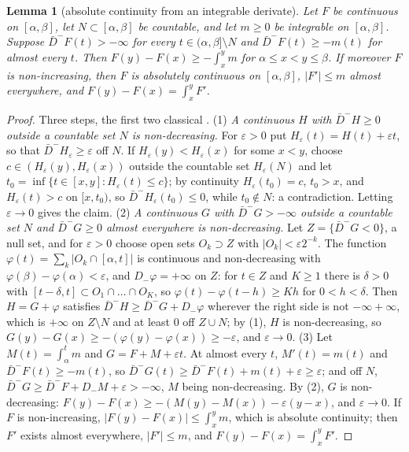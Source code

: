 \documentclass[11pt]{article}
\newtheorem{lemma}[theorem]{Lemma}
\theoremstyle{definition}
\theoremstyle{remark}
\begin{document}
\begin{lemma}[absolute continuity from an integrable derivate]\label{lem:acdini}
Let $F$ be continuous on $[\alpha,\beta]$, let $N\subset[\alpha,\beta]$ be countable, and let $m\ge0$ be integrable on $[\alpha,\beta]$. Suppose $\bar D^-F(t)>-\infty$ for every $t\in(\alpha,\beta]\setminus N$ and $\bar D^-F(t)\ge-m(t)$ for almost every $t$. Then $F(y)-F(x)\ge-\int_x^ym$ for $\alpha\le x<y\le\beta$. If moreover $F$ is non-increasing, then $F$ is absolutely continuous on $[\alpha,\beta]$, $|F'|\le m$ almost everywhere, and $F(y)-F(x)=\int_x^yF'$.
\end{lemma}
\begin{proof}
Three steps, the first two classical \cite[Ch.~VI]{saks}. (1) \emph{A continuous $H$ with $\bar D^-H\ge0$ outside a countable set $N$ is non-decreasing.} For $\varepsilon>0$ put $H_\varepsilon(t)=H(t)+\varepsilon t$, so that $\bar D^-H_\varepsilon\ge\varepsilon$ off $N$. If $H_\varepsilon(y)<H_\varepsilon(x)$ for some $x<y$, choose $c\in(H_\varepsilon(y),H_\varepsilon(x))$ outside the countable set $H_\varepsilon(N)$ and let $t_0=\inf\{t\in[x,y]:H_\varepsilon(t)\le c\}$; by continuity $H_\varepsilon(t_0)=c$, $t_0>x$, and $H_\varepsilon(t)>c$ on $[x,t_0)$, so $\bar D^-H_\varepsilon(t_0)\le0$, while $t_0\notin N$: a contradiction. Letting $\varepsilon\to0$ gives the claim. (2) \emph{A continuous $G$ with $\bar D^-G>-\infty$ outside a countable set $N$ and $\bar D^-G\ge0$ almost everywhere is non-decreasing.} Let $Z=\{\bar D^-G<0\}$, a null set, and for $\varepsilon>0$ choose open sets $O_k\supset Z$ with $|O_k|<\varepsilon2^{-k}$. The function $\varphi(t)=\sum_k|O_k\cap[\alpha,t]|$ is continuous and non-decreasing with $\varphi(\beta)-\varphi(\alpha)<\varepsilon$, and $D_-\varphi=+\infty$ on $Z$: for $t\in Z$ and $K\ge1$ there is $\delta>0$ with $[t-\delta,t]\subset O_1\cap\dots\cap O_K$, so $\varphi(t)-\varphi(t-h)\ge Kh$ for $0<h<\delta$. Then $H=G+\varphi$ satisfies $\bar D^-H\ge\bar D^-G+D_-\varphi$ wherever the right side is not $-\infty+\infty$, which is $+\infty$ on $Z\setminus N$ and at least $0$ off $Z\cup N$; by (1), $H$ is non-decreasing, so $G(y)-G(x)\ge-(\varphi(y)-\varphi(x))\ge-\varepsilon$, and $\varepsilon\to0$. (3) Let $M(t)=\int_\alpha^tm$ and $G=F+M+\varepsilon t$. At almost every $t$, $M'(t)=m(t)$ and $\bar D^-F(t)\ge-m(t)$, so $\bar D^-G(t)\ge\bar D^-F(t)+m(t)+\varepsilon\ge\varepsilon$; and off $N$, $\bar D^-G\ge\bar D^-F+D_-M+\varepsilon>-\infty$, $M$ being non-decreasing. By (2), $G$ is non-decreasing: $F(y)-F(x)\ge-(M(y)-M(x))-\varepsilon(y-x)$, and $\varepsilon\to0$. If $F$ is non-increasing, $|F(y)-F(x)|\le\int_x^ym$, which is absolute continuity; then $F'$ exists almost everywhere, $|F'|\le m$, and $F(y)-F(x)=\int_x^yF'$.
\end{proof}
\end{document}
